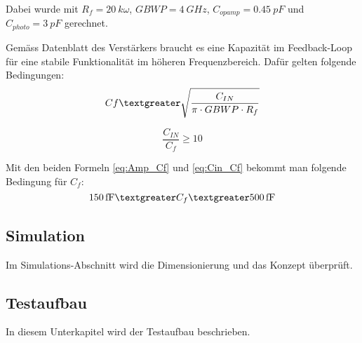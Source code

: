 Dabei wurde mit $R_{f}=\SI{20}{k\omega}$, $GBWP=\SI{4}{GHz}$, $C_{opamp}=\SI{0.45}{pF}$ und $C_{photo}=\SI{3}{pF}$ gerechnet.

Gemäss Datenblatt des Verstärkers braucht es eine Kapazität im Feedback-Loop für eine stabile Funktionalität im höheren Frequenzbereich. Dafür gelten folgende Bedingungen:
\begin{equation}\label{eq:Amp_Cf}
C{f}\textgreater \sqrt{\frac{C_{IN}}{\pi\cdot GBWP\cdot R_{f}}}
\end{equation}

\begin{equation}\label{eq:Cin_Cf}
\frac{C_{IN}}{C_{f}}\geq 10
\end{equation}

Mit den beiden Formeln \ref{eq:Amp_Cf} und \ref{eq:Cin_Cf} bekommt man folgende Bedingung für $C_{f}$: 
\begin{equation}\label{eq:Cfminmax}
\SI{150}{fF}\textgreater C_{f}\textgreater \SI{500}{fF}
\end{equation}


\subsection{Simulation}
Im Simulations-Abschnitt wird die Dimensionierung und das Konzept überprüft.
\subsection{Testaufbau}
In diesem Unterkapitel wird der Testaufbau beschrieben.